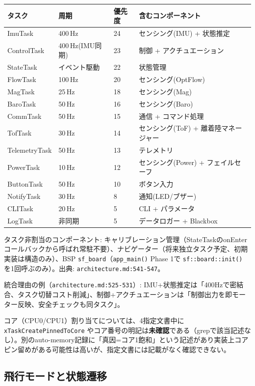 \documentclass[a4paper,10pt]{ltjsarticle}
\begin{document}
\begin{table}[h]
\centering\footnotesize
\begin{tabularx}{\textwidth}{@{}lllY@{}}
\toprule
タスク & 周期 & 優先度 & 含むコンポーネント \\
\midrule
ImuTask & 400\,Hz & 24 & センシング(IMU) + 状態推定 \\
ControlTask & 400\,Hz(IMU同期) & 23 & 制御 + アクチュエーション \\
StateTask & イベント駆動 & 22 & 状態管理 \\
FlowTask & 100\,Hz & 20 & センシング(OptFlow) \\
MagTask & 25\,Hz & 18 & センシング(Mag) \\
BaroTask & 50\,Hz & 16 & センシング(Baro) \\
CommTask & 50\,Hz & 15 & 通信 + コマンド処理 \\
TofTask & 30\,Hz & 14 & センシング(ToF) + 離着陸マネージャー \\
TelemetryTask & 50\,Hz & 13 & テレメトリ \\
PowerTask & 10\,Hz & 12 & センシング(Power) + フェイルセーフ \\
ButtonTask & 50\,Hz & 10 & ボタン入力 \\
NotifyTask & 30\,Hz & 8 & 通知(LED/ブザー) \\
CLITask & 20\,Hz & 5 & CLI + パラメータ \\
LogTask & 非同期 & 5 & データロガー + Blackbox \\
\bottomrule
\end{tabularx}
\end{table}

タスク非割当のコンポーネント: キャリブレーション管理（StateTaskのonEnterコールバックから呼ばれ常駐不要）、ナビゲーター（将来独立タスク予定、初期実装は構造のみ）、BSP \texttt{sf\_board}（\texttt{app\_main()} Phase 1で \texttt{sf::board::init()} を1回呼ぶのみ）。出典: \texttt{architecture.md:541-547}。

統合理由の例（\texttt{architecture.md:525-531}）: IMU+状態推定は「400Hzで密結合、タスク切替コスト削減」、制御+アクチュエーションは「制御出力を即モーター反映、安全チェックも同タスク」。

コア（CPU0/CPU1）割り当てについては、4指定文書中に \texttt{xTaskCreatePinnedToCore} やコア番号の明記は\textbf{未確認}である（grepで該当記述なし）。別のauto-memory記録に「真因=コア1飽和」という記述があり実装上コアピン留めがある可能性は高いが、指定文書には記載がなく確認できない。

\subsection{飛行モードと状態遷移}
\end{document}
